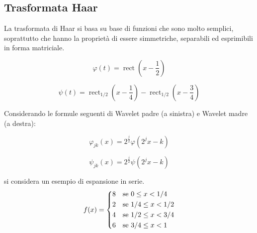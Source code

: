 \subsection{Trasformata Haar}
La trasformata di Haar si basa su base di funzioni che sono molto semplici, soprattutto che hanno la proprietà di essere simmetriche, separabili ed
esprimibili in forma matriciale.
\begin{center}
\begin{minipage}{0.48\textwidth} %
    \centering
    \begin{equation*}
        \varphi(t)=\operatorname{rect}\left(x-\frac{1}{2}\right)
    \end{equation*}
\end{minipage}
\hfill %
\begin{minipage}{0.48\textwidth} %
    \centering
    \begin{equation*}
        \psi(t)=\operatorname{rect}_{1/2}\left(x-\frac{1}{4}\right)-\operatorname{rect}_{1/2}\left(x-\frac{3}{4}\right)
    \end{equation*}
\end{minipage}
\end{center}
Considerando le formule seguenti di Wavelet padre (a sinistra) e Wavelet madre (a destra):
\begin{center}
\begin{minipage}{0.48\textwidth} %
    \centering
    \begin{equation*}
        \varphi_{jk}(x)=2^{\frac{j}{2}}\varphi\left(2^jx-k\right)
    \end{equation*}
\end{minipage}
\hfill %
\begin{minipage}{0.48\textwidth} %
    \centering
    \begin{equation*}
        \psi_{jk}(x)=2^{\frac{j}{2}}\psi\left(2^jx-k\right)
    \end{equation*}
\end{minipage}
\end{center} 
si considera un esempio di espansione in serie.
\begin{equation*}
    f(x)=\begin{dcases}
        8 & \text{se } 0 \le x < 1/4 \\
        2 & \text{se } 1/4 \le x < 1/2 \\
        4 & \text{se } 1/2 \le x < 3/4 \\
        6 & \text{se } 3/4 \le x < 1
    \end{dcases}
\end{equation*}
